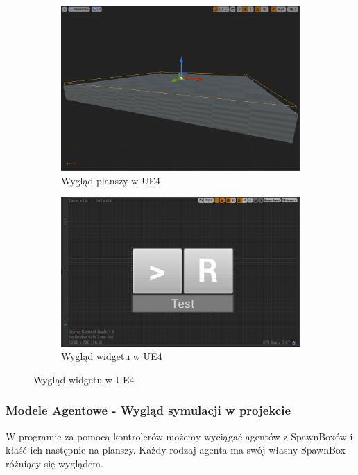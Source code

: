 \documentclass[a4paper,12pt,reqno]{article}
\begin{document}
\begin{figure}[H]%
	\centering
	\begin{subfigure}{.5\textwidth}
		\centering
		\includegraphics[width=0.8\linewidth]{graphics//agent/BP_AgentTable.png}
		\caption{Wygląd planszy w UE4}	
		\label{ref:subref_a}
	\end{subfigure}%
	\begin{subfigure}{.5\textwidth}
		\centering
		\includegraphics[width=0.8\linewidth]{graphics//agent/BP_AgentControl.png}
		\caption{Wygląd widgetu w UE4}
		\label{ref:subref_b}
	\end{subfigure}%
\label{ref:ref}
\end{figure}

\subsubsection{Modele Agentowe - Wygląd symulacji w projekcie}
W programie za pomocą kontrolerów możemy wyciągać agentów z SpawnBoxów i kłaść ich następnie na planszy. Każdy rodzaj agenta ma swój własny SpawnBox różniący się wyglądem.
\end{document}
